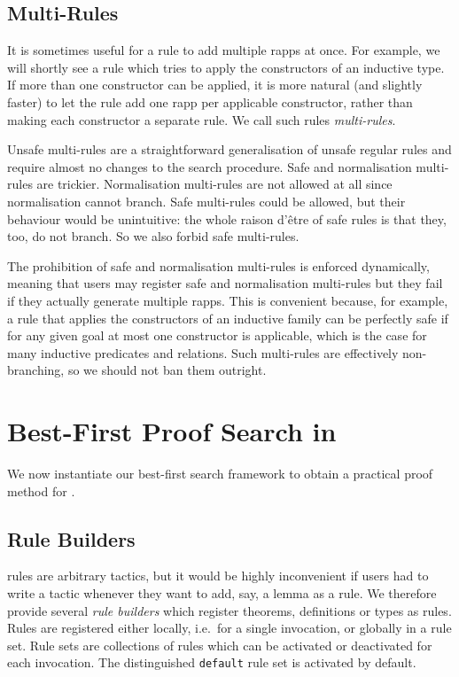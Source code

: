 \subsection{Multi-Rules}

It is sometimes useful for a rule to add multiple rapps at once.
For example, we will shortly see a rule which tries to apply the constructors of an inductive type.
If more than one constructor can be applied, it is more natural (and slightly faster) to let the rule add one rapp per applicable constructor, rather than making each constructor a separate rule.
We call such rules \emph{multi-rules}.

Unsafe multi-rules are a straightforward generalisation of unsafe regular rules and require almost no changes to the search procedure.
Safe and normalisation multi-rules are trickier.
Normalisation multi-rules are not allowed at all since normalisation cannot branch.
Safe multi-rules could be allowed, but their behaviour would be unintuitive: the whole raison d'être of safe rules is that they, too, do not branch.
So we also forbid safe multi-rules.

The prohibition of safe and normalisation multi-rules is enforced dynamically, meaning that users may register safe and normalisation multi-rules but they fail if they actually generate multiple rapps.
This is convenient because, for example, a rule that applies the constructors of an inductive family can be perfectly safe if for any given goal at most one constructor is applicable, which is the case for many inductive predicates and relations.
Such multi-rules are effectively non-branching, so we should not ban them outright.


\section{Best-First Proof Search in \Lean}%
\label{sec:concrete-framework}

We now instantiate our best-first search framework to obtain a practical proof method for \Lean.


\subsection{Rule Builders}%
\label{sec:rule-builders}

\Aesop{} rules are arbitrary tactics, but it would be highly inconvenient if users had to write a tactic whenever they want to add, say, a lemma as a rule.
We therefore provide several \emph{rule builders} which register theorems, definitions or types as rules. Rules are registered either locally, i.e.\ for a single \Aesop{} invocation, or globally in a rule set.
Rule sets are collections of rules which can be activated or deactivated for each \Aesop{} invocation.
The distinguished \texttt{default} rule set is activated by default.



